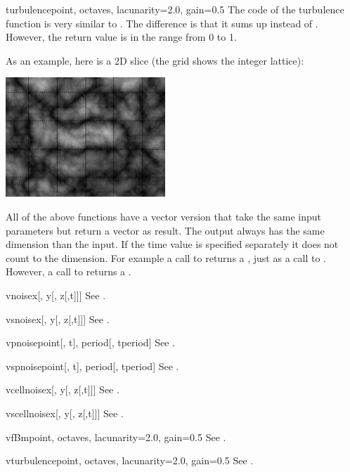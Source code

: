 \begin{funcdesc}{turbulence}{point, octaves, lacunarity=2.0, gain=0.5}
The code of the turbulence function is very similar to . The
difference is that it sums up  instead of . 
However, the return value is in the range from 0 to 1.

As an example, here is a 2D slice (the grid shows the integer lattice):

\begin{center}
\includegraphics[width=6cm]{pics/turbulence}
\end{center}
\end{funcdesc}


All of the above functions have a vector version that take the same
input parameters but return a vector as result. The output always has
the same dimension than the input. If the time value is specified
separately it does not count to the dimension. For example a call to
 returns a , just as a call to
. However, a call to  
returns a .

\begin{funcdesc}{vnoise}{x[, y[, z[,t]]]}
See .
\end{funcdesc}

\begin{funcdesc}{vsnoise}{x[, y[, z[,t]]]}
See .
\end{funcdesc}

\begin{funcdesc}{vpnoise}{point[, t], period[, tperiod]}
See .
\end{funcdesc}

\begin{funcdesc}{vspnoise}{point[, t], period[, tperiod]}
See .
\end{funcdesc}

\begin{funcdesc}{vcellnoise}{x[, y[, z[,t]]]}
See .
\end{funcdesc}

\begin{funcdesc}{vscellnoise}{x[, y[, z[,t]]]}
See .
\end{funcdesc}

\begin{funcdesc}{vfBm}{point, octaves, lacunarity=2.0, gain=0.5}
See .
\end{funcdesc}

\begin{funcdesc}{vturbulence}{point, octaves, lacunarity=2.0, gain=0.5}
See .
\end{funcdesc}
